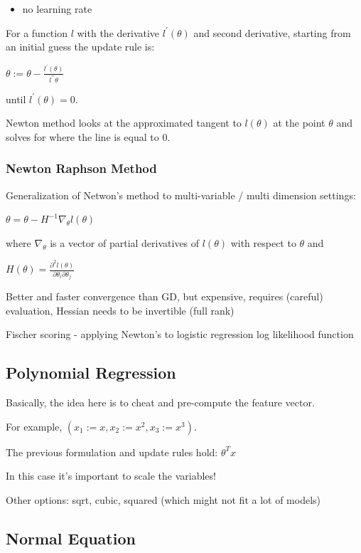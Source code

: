 \begin{itemize}
\item no learning rate
\end{itemize}

For a function $l$ with the derivative $l^\prime(\theta)$ and second derivative, starting from an initial guess the update rule is:

$\theta := \theta - \frac{l^\prime(\theta)}{l^{\prime\prime}\theta}$

until $l^\prime(\theta)=0$. 

Newton method looks at the approximated tangent to $l(\theta)$ at the point $\theta$ and solves for where the line is equal to 0.

\subsubsection{Newton Raphson Method}

Generalization of Netwon's method to multi-variable / multi dimension settings:

$\theta = \theta - H^{-1}\nabla_\theta l(\theta)$

where $\nabla_\theta$ is a vector of partial derivatives of $l(\theta)$ with respect to $\theta$ and 

$H(\theta)=\frac{\partial^2 l(\theta)}{\partial \theta_i\partial\theta_j}$

Better and faster convergence than GD, but expensive, requires (careful) evaluation, Hessian needs to be invertible (full rank)

Fischer scoring - applying Newton's to logistic regression log likelihood function

\subsection{Polynomial Regression}

Basically, the idea here is to cheat and pre-compute the feature vector. 

For example, $(x_1 := x, x_2 := x^2, x_3 := x^3)$. 

The previous formulation and update rules hold: $\theta^Tx$

In this case it's important to scale the variables!

Other options: sqrt, cubic, squared (which might not fit a lot of models)

\subsection{Normal Equation}

